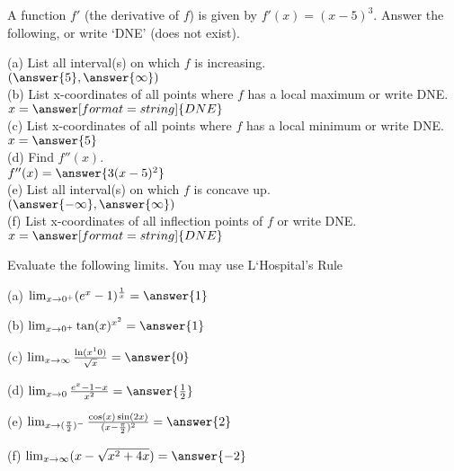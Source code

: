 \documentclass{ximera}
\begin{document}
\begin{exercise}
A function $f'$ (the derivative of $f$) is given by $f'(x)=(x-5)^3$. Answer the following, or write  `DNE' (does not exist).

(a) List all interval(s) on which $f$ is increasing.\\
$(\answer{5},\answer{\infty})$\\

(b) List x-coordinates of all points where $f$ has a local maximum or write DNE. \\
$x=\answer[format=string]{DNE}$\\

(c)  List x-coordinates of all points where $f$ has a local minimum or write DNE.\\

$x=\answer{5}$\\

(d) Find  $f''(x)$.\\

$f''(x)=\answer{3(x-5)^2}$\\

(e) List all interval(s) on which $f$ is concave up.\\

$(\answer{-\infty},\answer{\infty})$\\

(f) List x-coordinates of all inflection points of $f$ or write DNE.\\

$x=\answer[format=string]{DNE}$\\

\end{exercise}

\begin{exercise}
Evaluate the following limits.  You may use L`Hospital's Rule

(a) $\lim_{x\to 0^+} (e^x-1)^\frac{1}{x}=\answer{1}$

(b) $\lim_{x\to 0^+} \tan(x)^{x^2}=\answer{1}$

(c) $\lim_{x\to \infty} \frac{\ln(x^10)}{\sqrt{x}}=\answer{0}$

(d) $\lim_{x\to 0} \frac{e^x-1-x}{x^2}=\answer{\frac{1}{2}}$

(e) $\lim_{x\to (\frac{\pi}{2})^-} \frac{\cos(x)\sin(2x)}{(x-\frac{\pi}{2})^2}=\answer{2}$

(f) $\lim_{x\to\infty} (x-\sqrt{x^2+4x})=\answer{-2}$
\end{exercise}
\end{document}

